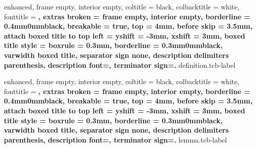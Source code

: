 {
    enhanced,
    frame empty,
    interior empty,
    coltitle = black,
    colbacktitle = white,
    fonttitle = \bfseries,
    extras broken = {frame empty, interior empty},
    borderline = {0.4mm}{0mm}{black},
    breakable = true,
    top = 4mm,
    before skip = 3.5mm,
    attach boxed title to top left = {yshift = -3mm, xshift = 3mm},
    boxed title style = {boxrule = 0.3mm, borderline = {0.3mm}{0mm}{black}},
    varwidth boxed title,
    separator sign none, description delimiters parenthesis,
    description font=\bfseries,
    terminator sign={.\hspace{1mm}}
}
{definition.tcb-label}

{
    enhanced,
    frame empty,
    interior empty,
    coltitle = black,
    colbacktitle = white,
    fonttitle = \bfseries,
    extras broken = {frame empty, interior empty},
    borderline = {0.4mm}{0mm}{black},
    breakable = true,
    top = 4mm,
    before skip = 3.5mm,
    attach boxed title to top left = {yshift = -3mm, xshift = 3mm},
    boxed title style = {boxrule = 0.3mm, borderline = {0.3mm}{0mm}{black}},
    varwidth boxed title,
    separator sign none, description delimiters parenthesis,
    description font=\bfseries,
    terminator sign={.\hspace{1mm}}
}
{lemma.tcb-label}

\newenvironment{section-theorem.tcb}[1][]
{
    \ifstrempty{#1}
    {
        \begin{tcb-theorem-style}{}{}
    }
    {
        \begin{tcb-theorem-style}{#1}{}
    }
    }{
    \end{tcb-theorem-style}
}

\newenvironment{section-problem.tcb}
{
    \begin{tcb-problem-style}{}{}
    }{
    \end{tcb-problem-style}
}

\newenvironment{section-exercise.tcb}
{
    \begin{tcb-exercise-style}{}{}
    }{
    \end{tcb-exercise-style}
}

\newenvironment{section-definition.tcb}[1][]
{
    \ifstrempty{#1}
    {
        \begin{tcb-definition-style}{}{}
    }
    {
        \begin{tcb-definition-style}{#1}{}
    }
    }{
    \end{tcb-definition-style}
}

\newenvironment{section-lemma.tcb}[1][]
{
\ifstrempty{#1}
{
\begin{tcb-lemma-style}{}{}
}
{
\begin{tcb-lemma-style}{#1}{}
}
}{
\end{tcb-lemma-style}
}